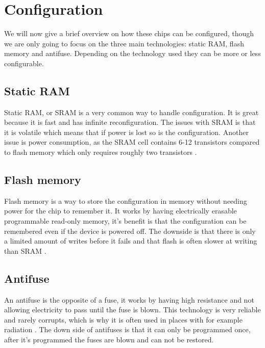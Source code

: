 \section{Configuration}
We will now give a brief overview on how these chips can be configured, though
we are only going to focus on the three main technologies: static RAM, flash
memory and antifuse. Depending on the technology used they can be more or less
configurable.

\subsection{Static RAM}
Static RAM, or SRAM is a very common way to handle configuration. It is great
because it is fast and has infinite reconfiguration. The issues with SRAM is
that it is volatile which means that if power is lost so is the configuration.
Another issue is power consumption, as the SRAM cell contains 6-12 transistors
compared to flash memory which only requires roughly two transistors
\citep{HideharuAmano8}.

\subsection{Flash memory}
Flash memory is a way to store the configuration in memory without needing
power for the chip to remember it. It works by having electrically erasable
programmable read-only memory, it's benefit is that the configuration can be
remembered even if the device is powered off. The downside is that there is only
a limited amount of writes before it fails and that flash is often slower at
writing than SRAM \citep{M.MorrisMano3}.

\subsection{Antifuse}
An antifuse is the opposite of a fuse, it works by having high resistance and
not allowing electricity to pass until the fuse is blown. This technology is
very reliable and rarely corrupts, which is why it is often used in places with
for example radiation \citep[Ch. 1]{ScottHauckAndreDeHon5}. The down side of antifuses is that it can only be
programmed once, after it's programmed the fuses are blown and can not be
restored.
